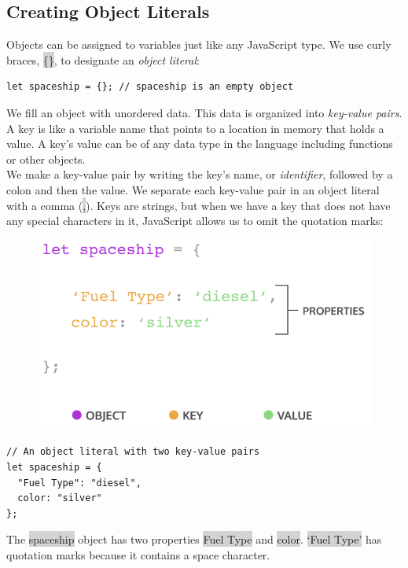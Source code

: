 \documentclass[11pt]{article}
\begin{document}
\subsection{Creating Object Literals} 
Objects can be assigned to variables just like any JavaScript type. We use curly braces, \colorbox{lightgray}{\{\}}, to designate an \textit{object literal}:
\begin{lstlisting}
let spaceship = {}; // spaceship is an empty object
\end{lstlisting}
We fill an object with unordered data. This data is organized into \textit{key-value pairs}. A key is like a variable name that points to a location in memory that holds a value. A key’s value can be of any data type in the language including functions or other objects. \\
\newline
We make a key-value pair by writing the key’s name, or \textit{identifier}, followed by a colon and then the value. We separate each key-value pair in an object literal with a comma (\colorbox{lightgray}{,}). Keys are strings, but when we have a key that does not have any special characters in it, JavaScript allows us to omit the quotation marks:
\begin{figure}[H]
\includegraphics[scale = 0.65]{10_1}
\centering 
\end{figure}
\newpage
\begin{lstlisting}
// An object literal with two key-value pairs
let spaceship = {
  "Fuel Type": "diesel",
  color: "silver"
};
\end{lstlisting}
The \colorbox{lightgray}{spaceship} object has two properties \colorbox{lightgray}{Fuel Type} and \colorbox{lightgray}{color}. \colorbox{lightgray}{`Fuel Type'} has quotation marks because it contains a space character.
\end{document}
